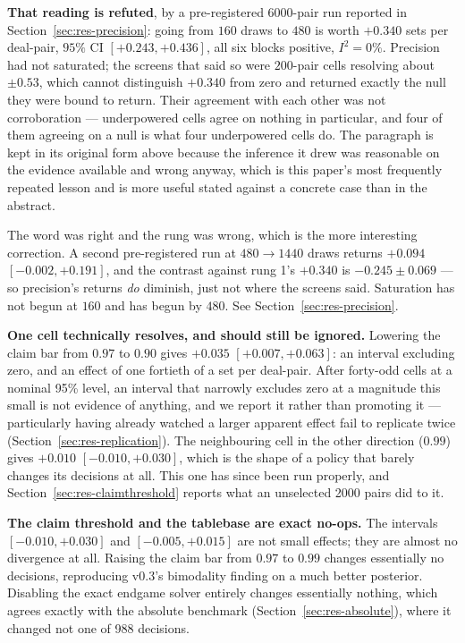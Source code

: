 \documentclass[11pt,a4paper]{article}
\begin{document}
\textbf{That reading is refuted}, by a pre-registered $6000$-pair run reported
in Section~\ref{sec:res-precision}: going from $160$ draws to $480$ is worth
$\mathbf{+0.340}$ sets per deal-pair, $95\%$ CI $[+0.243, +0.436]$, all six
blocks positive, $I^2 = 0\%$. Precision had not saturated; the screens that said
so were $200$-pair cells resolving about $\pm 0.53$, which cannot distinguish
$+0.340$ from zero and returned exactly the null they were bound to return.
Their agreement with each other was not corroboration --- underpowered cells
agree on nothing in particular, and four of them agreeing on a null is what four
underpowered cells do. The paragraph is kept in its original form above because
the inference it drew was reasonable on the evidence available and wrong anyway,
which is this paper's most frequently repeated lesson and is more useful stated
against a concrete case than in the abstract.

The word was right and the rung was wrong, which is the more interesting
correction. A second pre-registered run at $480 \to 1440$ draws returns
$+0.094$ $[-0.002, +0.191]$, and the contrast against rung 1's $+0.340$ is
$-0.245 \pm 0.069$ --- so precision's returns \emph{do} diminish, just not
where the screens said. Saturation has not begun at $160$ and has begun by
$480$. See Section~\ref{sec:res-precision}.

\textbf{One cell technically resolves, and should still be ignored.} Lowering
the claim bar from $0.97$ to $0.90$ gives $+0.035$ $[+0.007, +0.063]$: an
interval excluding zero, and an effect of one fortieth of a set per deal-pair.
After forty-odd cells at a nominal 95\% level, an interval that narrowly
excludes zero at a magnitude this small is not evidence of anything, and we
report it rather than promoting it --- particularly having already watched a
larger apparent effect fail to replicate twice
(Section~\ref{sec:res-replication}). The neighbouring cell in the other
direction ($0.99$) gives $+0.010$ $[-0.010, +0.030]$, which is the shape of a
policy that barely changes its decisions at all. This one has since been run
properly, and Section~\ref{sec:res-claimthreshold} reports what an unselected
2000 pairs did to it.

\textbf{The claim threshold and the tablebase are exact no-ops.} The intervals
$[-0.010, +0.030]$ and $[-0.005, +0.015]$ are not small effects; they are almost
no divergence at all. Raising the claim bar from $0.97$ to $0.99$ changes
essentially no decisions, reproducing v0.3's bimodality finding on a much better
posterior. Disabling the exact endgame solver entirely changes essentially
nothing, which agrees exactly with the absolute benchmark
(Section~\ref{sec:res-absolute}), where it changed not one of 988 decisions.
\end{document}
